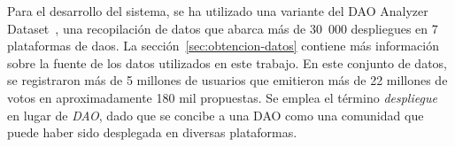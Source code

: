 
Para el desarrollo del sistema, se ha utilizado una variante del DAO Analyzer Dataset~\cite{arroyo_dao_2024}, una recopilación de datos que abarca más de 30~000 despliegues en 7 plataformas de \glspl{dao}. La sección~\ref{sec:obtencion-datos} contiene más información sobre la fuente de los datos utilizados en este trabajo. En este conjunto de datos, se registraron más de 5 millones de usuarios que emitieron más de 22 millones de votos en aproximadamente 180 mil propuestas. Se emplea el término \textit{despliegue} en lugar de \textit{DAO}, dado que se concibe a una DAO como una comunidad que puede haber sido desplegada en diversas plataformas.


